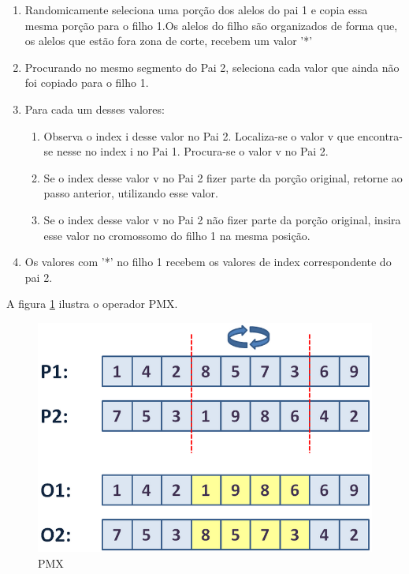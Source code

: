 \documentclass[twoside]{article}
\begin{document}
\begin{multicols}{2}
\begin{enumerate}
\item Randomicamente seleciona uma porção dos alelos do pai 1 e copia essa mesma porção para o filho 1.Os alelos do filho são organizados de forma que, os alelos que estão fora zona de corte, recebem um valor '*'
\item Procurando no mesmo segmento do Pai 2, seleciona cada valor que ainda não foi copiado para o filho 1.
\item Para cada um desses valores:
\begin{enumerate}
\item Observa o index i desse valor no Pai 2. Localiza-se o valor v que encontra-se nesse no index i no Pai 1. Procura-se o valor v no Pai 2.
\item Se o index desse valor v no Pai 2 fizer parte da porção original, retorne ao passo anterior, utilizando esse valor.
\item Se o index desse valor v no Pai 2 não fizer parte da porção original, insira esse valor no cromossomo do filho 1 na mesma posição.
\end{enumerate}
\item Os valores com '*' no filho 1 recebem os valores de index correspondente do pai 2.
\end{enumerate}

A figura \ref{fig:pmx} ilustra o operador PMX.
\begin{figure}[H]
\label{fig:pmx}
  \caption{PMX}
  \centering
    \includegraphics[scale = 0.3]{pmx_crossover.png}
\end{figure}


\end{multicols}
\end{document}
